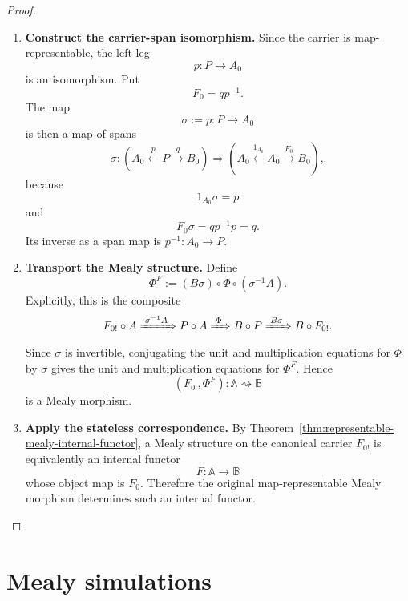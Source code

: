 \begin{proof}
    \leavevmode
    \begin{enumerate}
        \item \textbf{Construct the carrier-span isomorphism.} Since the carrier is map-representable, the left leg
        \[
            p:P\to A_0
        \]
        is an isomorphism. Put
        \[
            F_0=qp^{-1}.
        \]
        The map
        \[
            \sigma:=p:P\to A_0
        \]
        is then a map of spans
        \[
            \sigma:
            \left(
                A_0\xleftarrow{p}P\xrightarrow{q}B_0
            \right)
            \Longrightarrow
            \left(
                A_0\xleftarrow{1_{A_0}}A_0\xrightarrow{F_0}B_0
            \right),
        \]
        because
        \[
            1_{A_0}\sigma=p
        \]
        and
        \[
            F_0\sigma
            =
            qp^{-1}p
            =
            q.
        \]
        Its inverse as a span map is \(p^{-1}:A_0\to P\).

        \item \textbf{Transport the Mealy structure.} Define
        \[
            \Phi^F
            :=
            (B\sigma)\circ
            \Phi\circ
            (\sigma^{-1}A).
        \]
        Explicitly, this is the composite
        \[
            F_{0!}\circ A
                \xRightarrow{\;\sigma^{-1}A\;}
            P\circ A
                \xRightarrow{\;\Phi\;}
            B\circ P
                \xRightarrow{\;B\sigma\;}
            B\circ F_{0!}.
        \]
        Since \(\sigma\) is invertible, conjugating the unit and multiplication equations for \(\Phi\) by \(\sigma\) gives the unit and multiplication equations for \(\Phi^F\). Hence
        \[
            (F_{0!},\Phi^F):\mathbb A\rightsquigarrow\mathbb B
        \]
        is a Mealy morphism.

        \item \textbf{Apply the stateless correspondence.} By Theorem~\ref{thm:representable-mealy-internal-functor}, a Mealy structure on the canonical carrier \(F_{0!}\) is equivalently an internal functor
        \[
            F:\mathbb A\to\mathbb B
        \]
        whose object map is \(F_0\). Therefore the original map-representable Mealy morphism determines such an internal functor.
    \end{enumerate}
\end{proof}

\section{Mealy simulations}
\label{sec:mealy-simulations}
